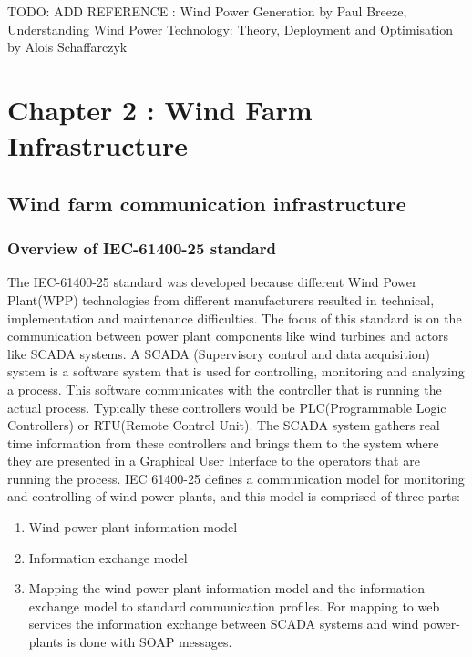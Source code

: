 \documentclass[twosided,a4,10pt]{article}
\begin{document}
\begin{multicols}{2}
\begin{description}
TODO: ADD REFERENCE : Wind Power Generation by Paul Breeze, Understanding Wind Power Technology: Theory, Deployment and Optimisation by Alois Schaffarczyk 
\end{description}

\section{Chapter 2 : Wind Farm Infrastructure }
 \subsection{Wind farm communication infrastructure}
  \subsubsection{Overview of IEC-61400-25 standard}
  	The IEC-61400-25 standard was developed because different Wind Power Plant(WPP) technologies from different manufacturers resulted in technical, implementation and maintenance difficulties. The focus of this standard is on the communication between power plant components like wind turbines and actors like SCADA systems. A SCADA (Supervisory control and data acquisition) system is a software system that is used for controlling, monitoring and analyzing a process. This software communicates with the controller that is running the actual process. Typically these controllers would be PLC(Programmable Logic Controllers) or RTU(Remote Control Unit). The SCADA system gathers real time information from these controllers and brings them to the system where they are presented in a Graphical User Interface to the operators that are running the process.\newline
  	IEC 61400-25 defines a communication model for monitoring and controlling of wind power plants, and this model is comprised of three parts:
  	\begin{enumerate}
  		\item Wind power-plant information model
  		\item Information exchange model
  		\item Mapping the wind power-plant information model and the information exchange model to standard communication profiles. For mapping to web services the information exchange between SCADA systems and wind power-plants is done with SOAP messages.
  	\end{enumerate}	

\end{multicols}
\end{document}
